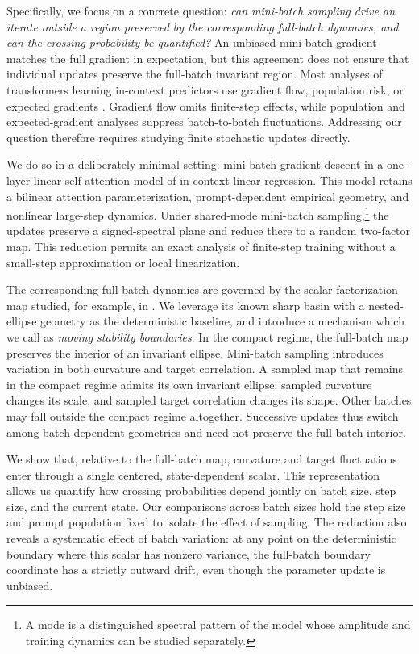 \documentclass[11pt]{article}
\begin{document}
Specifically, we focus on a concrete question: \emph{can mini-batch sampling drive an iterate outside a region preserved by the corresponding full-batch dynamics, and can the crossing probability be quantified?} An unbiased mini-batch gradient matches the full gradient in expectation, but this agreement does not ensure that individual updates preserve the full-batch invariant region. Most analyses of transformers learning in-context predictors use gradient flow, population risk, or expected gradients \citep{vonoswald2023gradient,ahn2023preconditioned,zhang2024trained,wu2024how,zhang2024context}. Gradient flow omits finite-step effects, while population and expected-gradient analyses suppress batch-to-batch fluctuations. Addressing our question therefore requires studying finite stochastic updates directly.

We do so in a deliberately minimal setting: mini-batch gradient descent in a one-layer linear self-attention model of in-context linear regression. This model retains a bilinear attention parameterization, prompt-dependent empirical geometry, and nonlinear large-step dynamics. Under shared-mode mini-batch sampling,\footnote{A mode is a distinguished spectral pattern of the model whose amplitude and training dynamics can be studied separately.} the updates preserve a signed-spectral plane and reduce there to a random two-factor map. This reduction permits an exact analysis of finite-step training without a small-step approximation or local linearization.

The corresponding full-batch dynamics are governed by the scalar factorization map studied, for example, in \citet{chen2023stability,liang2026gradient,moon2026state}. We leverage its known sharp basin with a nested-ellipse geometry as the deterministic baseline, and introduce a mechanism which we call as  \emph{moving stability boundaries}. In the compact regime, the full-batch map preserves the interior of an invariant ellipse. Mini-batch sampling introduces variation in both curvature and target correlation. A sampled map that remains in the compact regime admits its own invariant ellipse: sampled curvature changes its scale, and sampled target correlation changes its shape. Other batches may fall outside the compact regime altogether. Successive updates thus switch among batch-dependent geometries and need not preserve the full-batch interior.

We show that, relative to the full-batch map, curvature and target fluctuations enter through a single centered, state-dependent scalar. This representation allows us quantify how crossing probabilities depend jointly on batch size, step size, and the current state. Our comparisons across batch sizes hold the step size and prompt population fixed to isolate the effect of sampling. The reduction also reveals a systematic effect of batch variation: at any point on the deterministic boundary where this scalar has nonzero variance, the full-batch boundary coordinate has a strictly outward drift, even though the parameter update is unbiased.
\end{document}
